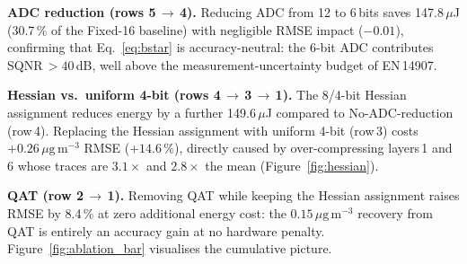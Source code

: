 \documentclass[12pt,a4paper]{article}
\begin{document}
\noindent\textbf{ADC reduction (rows 5\,$\to$\,4).}
Reducing ADC from 12 to 6\,bits saves 147.8\,$\mu$J (30.7\,\% of
the Fixed-16 baseline) with negligible RMSE impact ($-0.01$),
confirming that Eq.~\eqref{eq:bstar} is accuracy-neutral:
the 6-bit ADC contributes SQNR\,$>40$\,dB, well above the
measurement-uncertainty budget of EN\,14907.

\noindent\textbf{Hessian vs.\ uniform 4-bit (rows 4\,$\to$\,3\,$\to$\,1).}
The 8/4-bit Hessian assignment reduces energy by a further
149.6\,$\mu$J compared to No-ADC-reduction (row\,4).
Replacing the Hessian assignment with uniform 4-bit (row\,3) costs
$+0.26\,\mu\mathrm{g\,m^{-3}}$ RMSE ($+14.6\,\%$), directly caused
by over-compressing layers\,1 and\,6 whose traces are $3.1\times$
and $2.8\times$ the mean (Figure~\ref{fig:hessian}).

\noindent\textbf{QAT (row 2\,$\to$\,1).}
Removing QAT while keeping the Hessian assignment raises RMSE by
8.4\,\% at zero additional energy cost: the $0.15\,\mu\mathrm{g\,m^{-3}}$
recovery from QAT is entirely an accuracy gain at no hardware penalty.
Figure~\ref{fig:ablation_bar} visualises the cumulative picture.
\end{document}
